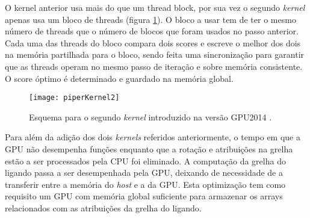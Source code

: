  O kernel anterior usa mais do que um thread block, por sua vez o segundo \textit{kernel} apenas usa um bloco de threads (figura \ref{k2piper}). O bloco a usar tem de ter o mesmo número de threads que o número de blocos que foram usados no passo anterior. Cada uma das threads do bloco compara dois scores e escreve o melhor dos dois na memória partilhada para o bloco, sendo feita uma sincronização para garantir que as threads operam no mesmo passo de iteração e sobre memória consistente. O score óptimo é determinado e guardado na memória global. \par
 \begin{figure}[ht]
  \centering
    {\texttt{[image: piperKernel2]}}
  \caption{Esquema para o segundo \textit{kernel} introduzido na versão GPU2014 \cite{piper2014gpu}. }
  \label{k2piper}
\end{figure}
Para além da adição dos dois \textit{kernels} referidos anteriormente, o tempo em que a GPU não desempenha funções enquanto que a rotação e atribuições na grelha estão a ser processados pela CPU foi eliminado. A computação da grelha do ligando passa a ser desempenhada pela GPU, deixando de necessidade de a transferir entre a memória do \textit{host} e a da GPU. Esta optimização tem como requisito um GPU com memória global suficiente para armazenar os arrays relacionados com as atribuições da grelha do ligando. \par
